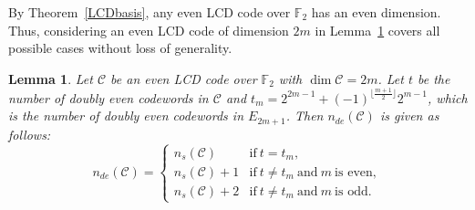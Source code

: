 \documentclass{article}
\newtheorem{lemma}[theorem]{Lemma}
\theoremstyle{definition}
\theoremstyle{remark}
\begin{document}
By Theorem~\ref{LCDbasis}, any even LCD code over $\mathbb{F}_2$ has an even dimension. Thus, considering an even LCD code of dimension $2m$ in Lemma~\ref{LCDdoublyevenembedding} covers all possible cases without loss of generality.

\begin{lemma}\label{LCDdoublyevenembedding}
    Let $\mathcal{C}$ be an even LCD code over $\mathbb{F}_2$ with $\dim \mathcal{C}=2m$. Let $t$ be the number of doubly even codewords in $\mathcal{C}$ and $t_m=2^{2m-1}+(-1)^{\lfloor \frac{m+1}{2}\rfloor}2^{m-1}$, which is the number of doubly even codewords in $E_{2m+1}$. Then $n_{de}(\mathcal{C})$ is given as follows:
    \[
    n_{de}(\mathcal{C})=\begin{cases}
        n_s(\mathcal{C}) & \mbox{if}~t=t_m,\\
        n_s(\mathcal{C})+1 & \mbox{if}~t\ne t_m~\mbox{and}~m~\mbox{is even},\\
        n_s(\mathcal{C})+2 & \mbox{if}~t\ne t_m~\mbox{and}~m~\mbox{is odd}.
    \end{cases}
    \]
\end{lemma}
\end{document}
